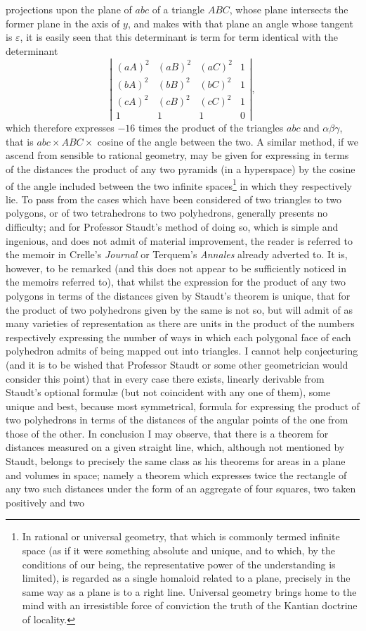 \documentclass[11pt]{article}
\newcommand{\sourcepage}[1]{\marginpar{\scriptsize p.~#1}}
\begin{document}
{{\sourcepage{388}
projections upon the plane of $abc$ of a triangle $ABC$, whose plane intersects the former plane in the axis of $y$, and makes with that plane an angle whose tangent is $\varepsilon$, it is easily seen that this determinant is term for term identical with the determinant
\[
\left|\begin{array}{cccc}
(aA)^2&(aB)^2&(aC)^2&1\\
(bA)^2&(bB)^2&(bC)^2&1\\
(cA)^2&(cB)^2&(cC)^2&1\\
1&1&1&0
\end{array}\right|,
\]
which therefore expresses $-16$ times the product of the triangles $abc$ and $\alpha\beta\gamma$, that is $abc\times ABC\times$ cosine of the angle between the two. A similar method, if we ascend from sensible to rational geometry, may be given for expressing in terms of the distances the product of any two pyramids (in a hyperspace) by the cosine of the angle included between the two infinite spaces\footnote{In rational or universal geometry, that which is commonly termed infinite space (as if it were something absolute and unique, and to which, by the conditions of our being, the representative power of the understanding is limited), is regarded as a single homaloid related to a plane, precisely in the same way as a plane is to a right line. Universal geometry brings home to the mind with an irresistible force of conviction the truth of the Kantian doctrine of locality.} in which they respectively lie. To pass from the cases which have been considered of two triangles to two polygons, or of two tetrahedrons to two polyhedrons, generally presents no difficulty; and for Professor Staudt's method of doing so, which is simple and ingenious, and does not admit of material improvement, the reader is referred to the memoir in Crelle's \emph{Journal} or Terquem's \emph{Annales} already adverted to. It is, however, to be remarked (and this does not appear to be sufficiently noticed in the memoirs referred to), that whilst the expression for the product of any two polygons in terms of the distances given by Staudt's theorem is unique, that for the product of two polyhedrons given by the same is not so, but will admit of as many varieties of representation as there are units in the product of the numbers respectively expressing the number of ways in which each polygonal face of each polyhedron admits of being mapped out into triangles. I cannot help conjecturing (and it is to be wished that Professor Staudt or some other geometrician would consider this point) that in every case there exists, linearly derivable from Staudt's optional formulæ (but not coincident with any one of them), some unique and best, because most symmetrical, formula for expressing the product of two polyhedrons in terms of the distances of the angular points of the one from those of the other. In conclusion I may observe, that there is a theorem for distances measured on a given straight line, which, although not mentioned by Staudt, belongs to precisely the same class as his theorems for areas in a plane and volumes in space; namely a theorem which expresses twice the rectangle of any two such distances under the form of an aggregate of four squares, two taken positively and two

}}
\end{document}
